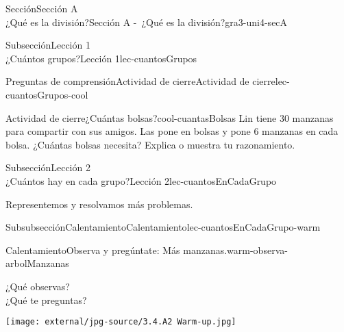 \begin{sectionptx}{Sección}{{\Large Sección A\\}¿Qué es la división?}{}{Sección A -~¿Qué es la división?}{}{}{gra3-uni4-secA}
\begin{subsectionptx}{Subsección}{{\normalsize Lección 1\\[-0.05cm]}¿Cuántos grupos?}{}{Lección 1}{}{}{lec-cuantosGrupos}
%
\typeout{************************************************}
\typeout{************************************************}
%
\begin{reading-questions-subsubsection}{Preguntas de comprensión}{Actividad de cierre}{}{Actividad de cierre}{}{}{lec-cuantosGrupos-cool}
\begin{project}{Actividad de cierre}{¿Cuántas bolsas?}{cool-cuantasBolsas}%
Lin tiene 30 manzanas para compartir con sus amigos. Las pone en bolsas y pone 6 manzanas en cada bolsa. ¿Cuántas bolsas necesita? Explica o muestra tu razonamiento.%
\end{project}%
\end{reading-questions-subsubsection}
\end{subsectionptx}
%
%
\typeout{************************************************}
\typeout{************************************************}
%
\begin{subsectionptx}{Subsección}{{\normalsize Lección 2\\[-0.05cm]}¿Cuántos hay en cada grupo?}{}{Lección 2}{}{}{lec-cuantosEnCadaGrupo}
\begin{introduction}{}%
Representemos y resolvamos más problemas.%
\end{introduction}%
%
%
\typeout{************************************************}
\typeout{************************************************}
%
\begin{subsubsectionptx}{Subsubsección}{Calentamiento}{}{Calentamiento}{}{}{lec-cuantosEnCadaGrupo-warm}
\begin{exploration}{Calentamiento}{Observa y pregúntate: Más manzanas.}{warm-observa-arbolManzanas}%
\begin{multicols}{2}
¿Qué observas?\\
 ¿Qué te preguntas?%
\vfill\columnbreak
\begin{image}{0}{1}{0}{}%
\texttt{[image: external/jpg-source/3.4.A2 Warm-up.jpg]}
\end{image}%
\end{multicols}
\end{exploration}%
\end{subsubsectionptx}
%
%
\typeout{************************************************}

\end{subsectionptx}
\end{sectionptx}
